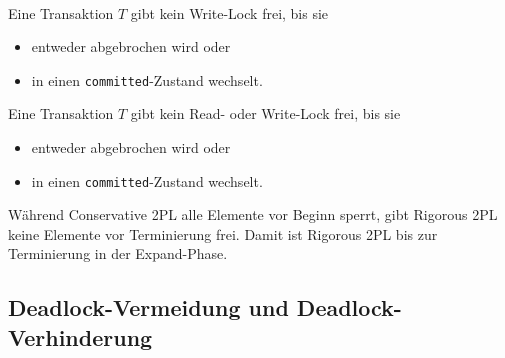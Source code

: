 \begin{frame}{\insertsection}
	\framesubtitle{\insertsubsection}
\begin{definition}[Strict 2PL]
Eine Transaktion $T$ gibt kein Write-Lock frei, bis sie 
\begin{itemize}
\item entweder abgebrochen wird oder 
\item in einen \texttt{committed}-Zustand wechselt.
\end{itemize}
\end{definition}

\begin{definition}[Rigorous 2PL]
Eine Transaktion $T$ gibt kein Read- oder Write-Lock frei, bis sie 
\begin{itemize}
\item entweder abgebrochen wird oder 
\item in einen \texttt{committed}-Zustand wechselt.
\end{itemize}
\end{definition}
\alert{Während Conservative 2PL alle Elemente vor Beginn sperrt, gibt Rigorous 2PL keine Elemente vor Terminierung frei. Damit ist Rigorous 2PL bis zur Terminierung in der Expand-Phase.}
\end{frame}

\subsection{Deadlock-Vermeidung und Deadlock-Verhinderung}

